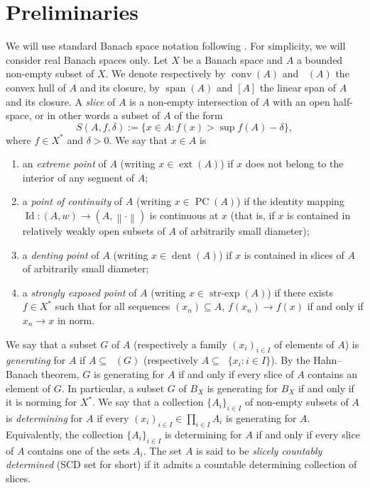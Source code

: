\documentclass[11pt,a4paper,reqno]{amsart}
\numberwithin{equation}{section}
\newcommand{\norm}[1]{\left\lVert#1\right\rVert}
\DeclareMathOperator{\dent}{dent}
\DeclareMathOperator{\Id}{Id}
\DeclareMathOperator{\conv}{conv}
\DeclareMathOperator{\cconv}{\overline{conv}}
\DeclareMathOperator{\spn}{span}
\DeclareMathOperator{\ext}{ext}
\DeclareMathOperator{\strexp}{str-exp}
\DeclareMathOperator{\PC}{PC}
\newcommand{\1}{\mathbbm{1}}
\theoremstyle{plain}
\theoremstyle{definition}
\begin{document}
\section{Preliminaries}\label{section:preliminaries}

We will use standard Banach space notation following \cite{FHHMZ11}. For simplicity, we will consider real Banach spaces only. Let $X$ be a Banach space and $A$ a bounded non-empty subset of $X$. We denote respectively by $\conv(A)$ and $\cconv(A)$ the convex hull of $A$ and its closure, by $\spn(A)$ and $[A]$ the linear span of $A$ and its closure. A \emph{slice} of $A$ is a non-empty intersection of $A$ with an open half-space, or in other words a subset of $A$ of the form \begin{equation*}
    S(A,f,\delta):=\{x\in A\colon f(x)>\sup f(A)-\delta\},
\end{equation*} where $f\in X^*$ and $\delta>0$. We say that $x\in A$ is
\begin{enumerate}
    \item an \emph{extreme point} of $A$ (writing $x\in \ext(A)$) if $x$ does not belong to the interior of any segment of $A$;
    \item a \emph{point of continuity} of $A$ (writing $x\in \PC(A)$) if the identity mapping $\Id\colon (A,w)\to(A,\norm{\cdot})$ is continuous at $x$ (that is, if $x$ is contained in relatively weakly open subsets of $A$ of arbitrarily small diameter);
    \item a \emph{denting point} of $A$ (writing $x\in\dent(A)$) if $x$ is contained in slices of $A$ of arbitrarily small diameter;
    \item a \emph{strongly exposed point} of $A$ (writing $x\in \strexp(A)$) if there exists $f\in X^*$ such that for all sequences $(x_n)\subseteq A$,  $f(x_n)\rightarrow f(x)$ if and only if $x_n\rightarrow x$ in norm.
\end{enumerate}

 We say that a subset $G$ of $A$ (respectively a family $(x_i)_{i\in I}$ of elements of $A$) is \emph{generating} for $A$ if $A\subseteq\cconv(G)$ (respectively $A\subseteq \cconv\{x_i\colon i\in I\}$). By the Hahn--Banach theorem, $G$ is generating for $A$ if and only if every slice of $A$ contains an element of $G$. In particular, a subset $G$ of $B_X$ is generating for $B_X$ if and only if it is norming for $X^*$. We say that a collection $\{A_i\}_{i\in I}$ of non-empty subsets of $A$ is \emph{determining} for $A$ if every $(x_i)_{i\in I}\in \prod_{i\in I}A_i$ is generating for $A$. Equivalently, the collection $\{A_i\}_{i\in I}$ is determining for $A$ if and only if every slice of $A$ contains one of the sets $A_i$. The set $A$ is said to be \emph{slicely countably determined} (SCD set for short) if it admits a countable determining collection of slices.
\end{document}
